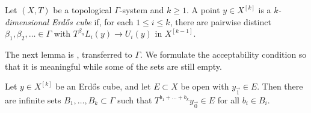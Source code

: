 \begin{definition}\label{K:def:cube}
Let $(X,T)$ be a topological $\Gamma$-system and $k\ge1$.
A point $y\in X^{[k]}$ is a \emph{$k$-dimensional Erdős cube} if, for each $1\le i\le k$,
there are pairwise distinct $\beta_1,\beta_2,\ldots\in\Gamma$ with
$T^{\beta_n}L_i(y)\to U_i(y)$ in $X^{[k-1]}$.
\end{definition}

The next lemma is \cite[Lemma~4.5 and Corollary~4.6]{kra2022infinite}, transferred to
$\Gamma$. We formulate the acceptability condition so that it is meaningful while some of
the sets are still empty.

\begin{lemma}\label{K:lem:cube-sumset}
Let $y\in X^{[k]}$ be an Erdős cube, and let $E\subset X$ be open with $y_{\vec1}\in E$.
Then there are infinite sets $B_1,\dots,B_k\subset\Gamma$ such that
$T^{b_1+\dots+b_k}y_{\vec0}\in E$ for all $b_i\in B_i$.
\end{lemma}

